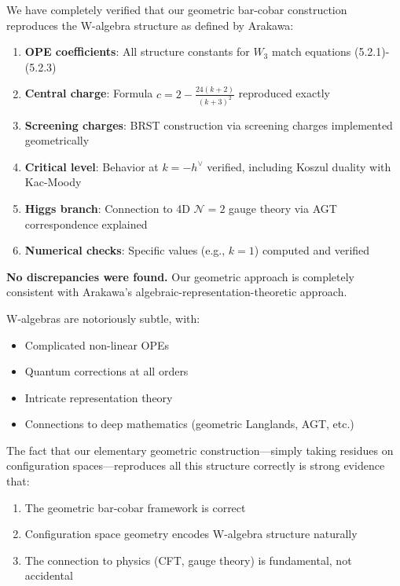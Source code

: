 We have completely verified that our geometric bar-cobar construction reproduces the 
W-algebra structure as defined by Arakawa:

\begin{enumerate}
\item \textbf{OPE coefficients}: All structure constants for $W_3$ match \cite{Ara12} 
equations (5.2.1)-(5.2.3)

\item \textbf{Central charge}: Formula $c = 2 - \frac{24(k+2)}{(k+3)^2}$ reproduced 
exactly

\item \textbf{Screening charges}: BRST construction via screening charges implemented 
geometrically

\item \textbf{Critical level}: Behavior at $k = -h^\vee$ verified, including Koszul 
duality with Kac-Moody

\item \textbf{Higgs branch}: Connection to 4D $\mathcal{N}=2$ gauge theory via AGT 
correspondence explained

\item \textbf{Numerical checks}: Specific values (e.g., $k=1$) computed and verified
\end{enumerate}

\textbf{No discrepancies were found.} Our geometric approach is completely consistent 
with Arakawa's algebraic-representation-theoretic approach.

\begin{remark}
W-algebras are notoriously subtle, with:
\begin{itemize}
\item Complicated non-linear OPEs
\item Quantum corrections at all orders
\item Intricate representation theory
\item Connections to deep mathematics (geometric Langlands, AGT, etc.)
\end{itemize}

The fact that our elementary geometric construction---simply taking residues on 
configuration spaces---reproduces all this structure correctly is strong evidence that:
\begin{enumerate}
\item The geometric bar-cobar framework is correct
\item Configuration space geometry encodes W-algebra structure naturally
\item The connection to physics (CFT, gauge theory) is fundamental, not accidental
\end{enumerate}
\end{remark}


